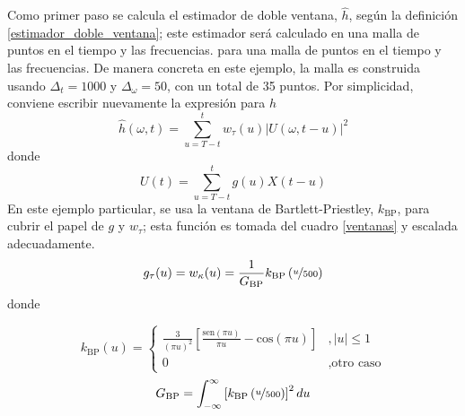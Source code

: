 \documentclass[12pt,letterpaper]{book}
\newcommand{\intR}{\int_{-\infty}^{\infty}}
\newcommand{\COS}[1]{\mathrm{cos}\left( #1 \right)}
\newcommand{\SEN}[1]{\mathrm{sen}\left( #1 \right)}
\newcommand{\abso}[1]{\left| #1 \right|}
\begin{document}
Como primer paso se calcula el estimador de doble ventana, $\widehat{h}$, según la definición \ref{estimador_doble_ventana}; este estimador será calculado en una malla de puntos en el tiempo y las frecuencias.
%
para una malla de puntos en el tiempo y las frecuencias.
%
De manera concreta en este ejemplo,
la malla es construida usando $\Delta_t = 1000$ y $\Delta_\omega=50$,
con un total de 35 puntos.
%
%
Por simplicidad, conviene escribir nuevamente la expresión para $\widehat{h}$
\begin{equation}
\widehat{h}(\omega, t) = \sum_{u=T-t}^t w_\tau (u) \abso{U(\omega,t-u)}^{2}
\end{equation}
donde
\begin{equation}
U(t) = \sum_{u=T-t}^t g(u) X(t-u)
\end{equation}
%
En este ejemplo particular, se usa la ventana de Bartlett-Priestley, $k_\text{BP}$, para cubrir el papel de $g$ y $w_\tau$; esta función es tomada del cuadro \ref{ventanas} y
escalada adecuadamente.
\begin{equation}
g_\tau(u) = w_\kappa(u) = \frac{1}{G_{\text{BP}}} k_{\text{BP}}\left( \nicefrac{u}{500} \right)
\end{equation}
donde

\begin{equation}
k_{\text{BP}} (u) = \begin{cases}
\frac{3}{\left( \pi u \right)^2} 
\left[ 
\frac{\SEN{\pi u}}{\pi u} - \COS{\pi u} \right] &, \abso{u} 
\leq 1 \\
0 &, \text{otro caso}
\end{cases}
\end{equation}
\begin{equation}
G_{\text{BP}} = \intR \left[ k_{\text{BP}}\left( \nicefrac{u}{500} \right) \right]^2 du
\end{equation}
\end{document}
